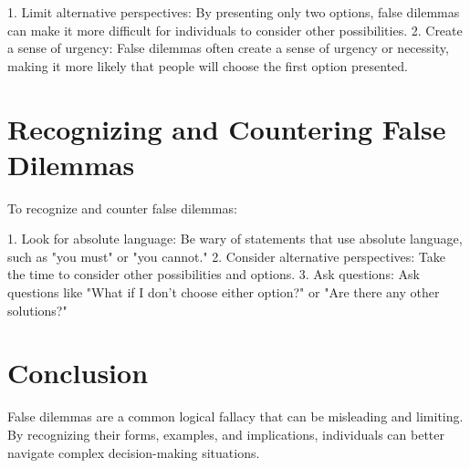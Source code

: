 1. Limit alternative perspectives: By presenting only two options, false dilemmas can make it more difficult for individuals to consider other possibilities.
2. Create a sense of urgency: False dilemmas often create a sense of urgency or necessity, making it more likely that people will choose the first option presented.

\section{Recognizing and Countering False Dilemmas}

To recognize and counter false dilemmas:

1. Look for absolute language: Be wary of statements that use absolute language, such as "you must" or "you cannot."
2. Consider alternative perspectives: Take the time to consider other possibilities and options.
3. Ask questions: Ask questions like "What if I don't choose either option?" or "Are there any other solutions?"

\section{Conclusion}

False dilemmas are a common logical fallacy that can be misleading and limiting. By recognizing their forms, examples, and implications, individuals can better navigate complex decision-making situations.